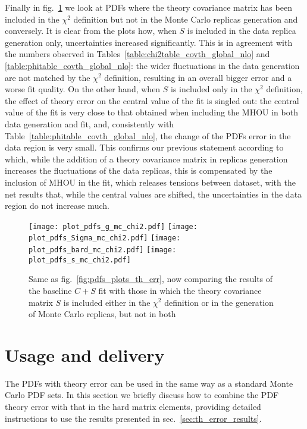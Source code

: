     Finally in fig.~\ref{fig:pdfs_plots_th_err_mc_chi2} we look at PDFs where the theory covariance matrix has been
    included in the $\chi^2$ definition but not in the Monte Carlo replicas generation and conversely.
    It is clear from the plots how, when $S$ is included in the data replica generation only, 
    uncertainties increased significantly. This is in agreement with the numbers observed in 
    Tables~\ref{table:chi2table_covth_global_nlo} and \ref{table:phitable_covth_global_nlo}: the wider fluctuations 
    in the data generation are not matched by the $\chi^2$ definition, resulting in an overall bigger error and a worse
    fit quality.
    On the other hand, when $S$ is included only in the $\chi^2$ definition, the effect of theory error on
    the central value of the fit is singled out: the central value of the fit is very close to that obtained 
    when including the MHOU in both data generation and fit, and, consistently with Table~\ref{table:phitable_covth_global_nlo},
    the change of the PDFs error in the data region is very small.
    This confirms our previous statement according to which, while the addition of a theory covariance matrix
    in replicas generation increases the fluctuations of the data replicas, this is compensated by the inclusion of MHOU
    in the fit, which releases tensions between dataset, with the net results that, while the central values are shifted, 
    the uncertainties in the data region do not increase much.
    \begin{figure}[t!]
        \begin{center}
            \texttt{[image: plot\_pdfs\_g\_mc\_chi2.pdf]}
            \texttt{[image: plot\_pdfs\_Sigma\_mc\_chi2.pdf]}
            \texttt{[image: plot\_pdfs\_bard\_mc\_chi2.pdf]}
            \texttt{[image: plot\_pdfs\_s\_mc\_chi2.pdf]}
            \caption{Same as fig.~\ref{fig:pdfs_plots_th_err}, now comparing the results of the baseline $C + S$
            fit with those in which the theory covariance matrix $S$ is included
            either in the $\chi^2$ definition or in the generation of Monte Carlo replicas, but not in both} 
            \label{fig:pdfs_plots_th_err_mc_chi2} 
        \end{center}
    \end{figure}

    \section{Usage and delivery}
    \label{sec:th_error_usage}
    The PDFs with theory error can be used in the same way as a standard Monte Carlo PDF sets.
    In this section we briefly discuss how to combine the PDF theory error with that in the hard matrix elements,
    providing detailed instructions to use the results presented in sec.~\ref{sec:th_error_results}. 

